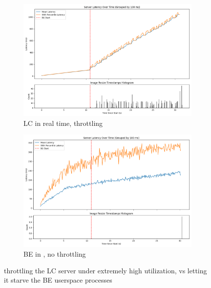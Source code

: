 \begin{figure}[t]
    \centering
    \begin{subfigure}[t]{0.49\columnwidth}
        \includegraphics[width=\columnwidth]{graphs/rt-throttled.png}
    \caption{LC in real time, throttling}\label{fig:realtime-throttled}
    \end{subfigure}
    \hspace{\fill}
    \begin{subfigure}[t]{0.49\columnwidth}
        \includegraphics[width=\columnwidth]{graphs/patched-not-throttled.png}
        \caption{BE in \schedbe{}, no throttling}\label{fig:patched-not-throttled}
    \end{subfigure}
    \vspace{4pt}
    \caption{throttling the LC server under extremely high utilization, vs
    letting it starve the BE userspace processes}
\end{figure}


